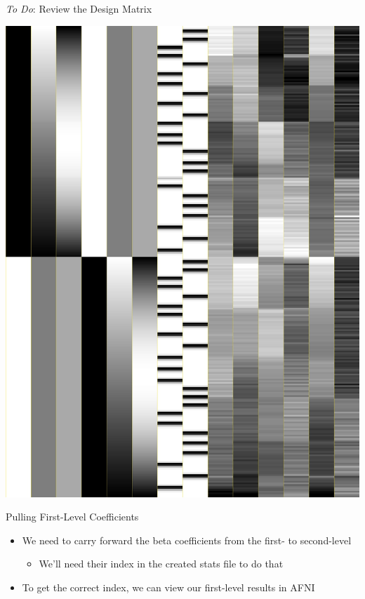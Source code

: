 \documentclass[t,12pt]{beamer}
\begin{document}
\begin{frame}{\emph{To Do}: Review the Design Matrix}
\begin{minipage}{0.30\textwidth}
\includegraphics[width=\textwidth]{images/X.jpg}
\end{minipage}
\end{frame}

\begin{frame}{Pulling First-Level \textbeta{} Coefficients}
\vspace{10pt}
\begin{itemize}
\setlength\itemsep{1em}
\item We need to carry forward the beta coefficients from the first- to second-level
\vspace{4pt}
\begin{itemize}
\setlength\itemsep{0.5em}
\item We'll need their index in the created stats file to do that
\end{itemize}
\item To get the correct index, we can view our first-level results in AFNI
\end{itemize}
\end{frame}
\end{document}
